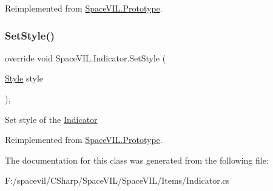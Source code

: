 Reimplemented from \mbox{\hyperlink{class_space_v_i_l_1_1_prototype_ac3379fe02923ee155b5b0084abf27420}{Space\+V\+I\+L.\+Prototype}}.

\mbox{\label{class_space_v_i_l_1_1_indicator_aa9233e9dda656a3634bcc3ace59c00dc}} 
\subsubsection{\texorpdfstring{Set\+Style()}{SetStyle()}}
{\footnotesize\ttfamily override void Space\+V\+I\+L.\+Indicator.\+Set\+Style (\begin{DoxyParamCaption}\item[{\mbox{\hyperlink{class_space_v_i_l_1_1_decorations_1_1_style}{Style}}}]{style }\end{DoxyParamCaption})\hspace{0.3cm}{\ttfamily [inline]}, {\ttfamily [virtual]}}



Set style of the \mbox{\hyperlink{class_space_v_i_l_1_1_indicator}{Indicator}} 



Reimplemented from \mbox{\hyperlink{class_space_v_i_l_1_1_prototype_ae96644a6ace490afb376fb542161e541}{Space\+V\+I\+L.\+Prototype}}.



The documentation for this class was generated from the following file\+:\begin{DoxyCompactItemize}
\item 
F\+:/spacevil/\+C\+Sharp/\+Space\+V\+I\+L/\+Space\+V\+I\+L/\+Items/Indicator.\+cs\end{DoxyCompactItemize}
